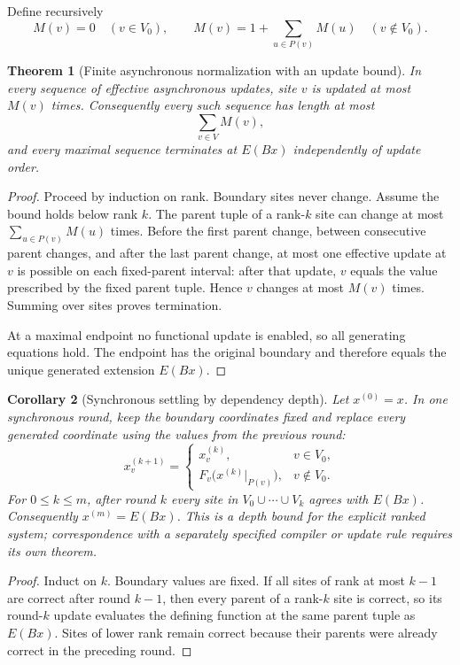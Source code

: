 \documentclass[11pt]{article}
\newtheorem{theorem}{Theorem}[section]
\newtheorem{corollary}[theorem]{Corollary}
\theoremstyle{definition}
\theoremstyle{remark}
\numberwithin{equation}{section}
\begin{document}
Define recursively
\[
 M(v)=0\quad(v\in V_0),
 \qquad
 M(v)=1+\sum_{u\in P(v)}M(u)\quad(v\notin V_0).
\]

\begin{theorem}[Finite asynchronous normalization with an update bound]\label{thm:functional-termination}
In every sequence of effective asynchronous updates, site $v$ is updated at most $M(v)$ times.  Consequently every such sequence has length at most
\[
 \sum_{v\in V}M(v),
\]
and every maximal sequence terminates at $E(Bx)$ independently of update order.
\end{theorem}

\begin{proof}
Proceed by induction on rank.  Boundary sites never change.  Assume the bound
holds below rank $k$.  The parent tuple of a rank-$k$ site can change at most
$\sum_{u\in P(v)}M(u)$ times.  Before the first parent change, between
consecutive parent changes, and after the last parent change, at most one
effective update at $v$ is possible on each fixed-parent interval: after that
update, $v$ equals the value prescribed by the fixed parent tuple.  Hence $v$
changes at most $M(v)$ times.  Summing over sites proves termination.

At a maximal endpoint no functional update is enabled, so all generating equations hold.  The endpoint has the original boundary and therefore equals the unique generated extension $E(Bx)$.
\end{proof}

\begin{corollary}[Synchronous settling by dependency depth]\label{cor:functional-synchronous}
Let $x^{(0)}=x$.  In one synchronous round, keep the boundary coordinates
fixed and replace every generated coordinate using the values from the
previous round:
\[
 x_v^{(k+1)}
 =
 \begin{cases}
 x_v^{(k)},&v\in V_0,\\
 F_v\bigl(x^{(k)}|_{P(v)}\bigr),&v\notin V_0.
 \end{cases}
\]
For $0\le k\le m$, after round $k$ every site in
$V_0\cup\cdots\cup V_k$ agrees with
$E(Bx)$.  Consequently $x^{(m)}=E(Bx)$.  This is a depth bound for the
explicit ranked system; correspondence with a separately specified compiler
or update rule requires its own theorem.
\end{corollary}

\begin{proof}
Induct on $k$.  Boundary values are fixed.  If all sites of rank at most
$k-1$ are correct after round $k-1$, then every parent of a rank-$k$ site is
correct, so its round-$k$ update evaluates the defining function at the same
parent tuple as $E(Bx)$.  Sites of lower rank remain correct because their
parents were already correct in the preceding round.
\end{proof}
\end{document}
